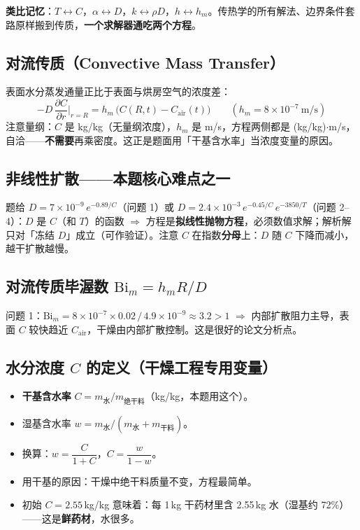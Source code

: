 \documentclass[12pt,a4paper]{ctexart}
\begin{document}
\noindent\textbf{类比记忆}：$T\leftrightarrow C$，$\alpha\leftrightarrow D$，$k\leftrightarrow\rho D$，$h\leftrightarrow h_m$。传热学的所有解法、边界条件套路原样搬到传质，\textbf{一个求解器通吃两个方程}。

\subsection{对流传质（Convective Mass Transfer）}
表面水分蒸发通量正比于表面与烘房空气的浓度差：
\begin{equation}
-D\,\frac{\partial C}{\partial r}\bigg|_{r=R}=h_m\,\big(C(R,t)-C_{\mathrm{air}}(t)\big) \qquad (h_m=8\times10^{-7}\ \text{m/s})
\end{equation}
注意量纲：$C$ 是 kg/kg（无量纲浓度），$h_m$ 是 m/s，方程两侧都是 (kg/kg)$\cdot$m/s，自洽——\textbf{不需要}再乘密度。这正是题面用「干基含水率」当浓度变量的原因。

\subsection{非线性扩散——本题核心难点之一}
题给 $D=7\times10^{-9}\,e^{-0.89/C}$（问题 1）或 $D=2.4\times10^{-3}\,e^{-0.45/C}\,e^{-3850/T}$（问题 2--4）：$D$ 是 $C$（和 $T$）的函数 $\Rightarrow$ 方程是\textbf{拟线性抛物方程}，必须数值求解；解析解只对「冻结 $D$」成立（可作验证）。注意 $C$ 在指数\textbf{分母}上：$D$ 随 $C$ 下降而减小，越干扩散越慢。

\subsection{对流传质毕渥数 $\mathrm{Bi}_m=h_m R/D$}
问题 1：$\mathrm{Bi}_m=8\times10^{-7}\times0.02\,/\,4.9\times10^{-9}\approx3.2>1$ $\Rightarrow$ 内部扩散阻力主导，表面 $C$ 较快趋近 $C_{\mathrm{air}}$，干燥由内部扩散控制。这是很好的论文分析点。

\subsection{水分浓度 $C$ 的定义（干燥工程专用变量）}
\begin{itemize}
\item \textbf{干基含水率} $C=m_{\text{水}}/m_{\text{绝干料}}$（kg/kg，本题用这个）。
\item 湿基含水率 $w=m_{\text{水}}/(m_{\text{水}}+m_{\text{干料}})$。
\item 换算：$w=\dfrac{C}{1+C}$，$C=\dfrac{w}{1-w}$。
\item 用干基的原因：干燥中绝干料质量不变，方程最简单。
\item 初始 $C=2.55$\,kg/kg 意味着：每 1\,kg 干药材里含 2.55\,kg 水（湿基约 72\%）——这是\textbf{鲜药材}，水很多。
\end{itemize}
\end{document}
